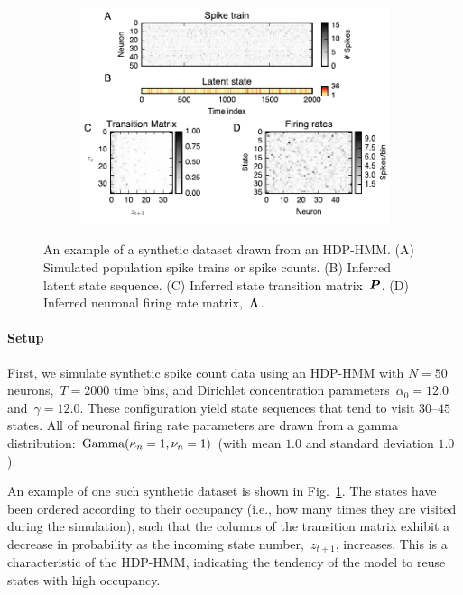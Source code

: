\begin{figure}[t]
  \centering
  \begin{subfigure}[t]{5.in}
    \includegraphics[width=\textwidth]{figures/ch7/Fig1.pdf}
  \end{subfigure}
  \vspace{-.2in}
  \caption[A synthetic dataset drawn from an HDP-HMM]{ An example of a
    synthetic dataset drawn from an HDP-HMM.  (A) Simulated population
    spike trains or spike counts. (B) Inferred latent state
    sequence. (C) Inferred state transition matrix~$\boldsymbol{P}$. (D) Inferred
    neuronal firing rate matrix,~$\boldsymbol{\Lambda}$.}
\label{fig1}
\end{figure}

\paragraph{Setup}
\sloppy
 First, we simulate synthetic spike count data using an HDP-HMM with
 ${N=50}$ neurons,~${T=2000}$ time bins, and Dirichlet concentration
 parameters~${\alpha_0=12.0}$ and~${\gamma=12.0}$. These configuration
 yield state sequences that tend to visit $30$--$45$ states. All of
 neuronal firing rate parameters are drawn from a gamma distribution:
 ${\mathrm{Gamma}(\kappa_n=1, \nu_n=1)}$ (with mean $1.0$ and standard
 deviation $1.0$).
 
 An example of one such synthetic dataset is shown in
 Fig.~\ref{fig1}. The states have been ordered according to their
 occupancy (i.e., how many times they are visited during the
 simulation), such that the columns of the transition matrix exhibit a
 decrease in probability as the incoming state number,~$z_{t+1}$,
 increases. This is a characteristic of the HDP-HMM, indicating the
 tendency of the model to reuse states with high occupancy.

